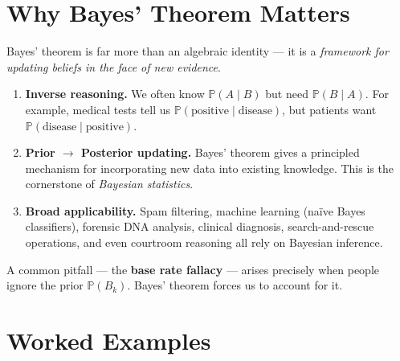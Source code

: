 \documentclass{article}
\theoremstyle{remark}
\newlength{\subsecindent}
\newenvironment{secbody}{%
  \begin{list}{}{%
    \setlength{\leftmargin}{\subsecindent}%
    \setlength{\rightmargin}{0pt}%
    \setlength{\topsep}{0pt}%
    \setlength{\partopsep}{0pt}%
    \setlength{\parsep}{\parskip}%
    \setlength{\itemsep}{\parskip}%
  }\item\relax
}{\end{list}}
\newcommand{\Prob}{\mathbb{P}}
\newcommand{\given}{\mid}
\begin{document}
\newpage
\section{Why Bayes' Theorem Matters}
\label{sec:why}

\begin{secbody}
Bayes' theorem is far more than an algebraic identity --- it is a
\emph{framework for updating beliefs in the face of new evidence}.

\begin{enumerate}
  \item \textbf{Inverse reasoning.}
    We often know $\Prob(A \given B)$ but need $\Prob(B \given A)$.
    For example, medical tests tell us
    $\Prob(\text{positive} \given \text{disease})$, but patients want
    $\Prob(\text{disease} \given \text{positive})$.

  \item \textbf{Prior $\to$ Posterior updating.}
    Bayes' theorem gives a principled mechanism for incorporating new data
    into existing knowledge.  This is the cornerstone of
    \emph{Bayesian statistics}.

  \item \textbf{Broad applicability.}
    Spam filtering, machine learning (na\"ive Bayes classifiers),
    forensic DNA analysis, clinical diagnosis, search-and-rescue
    operations, and even courtroom reasoning all rely on Bayesian
    inference.
\end{enumerate}

A common pitfall --- the \textbf{base rate fallacy} --- arises precisely
when people ignore the prior $\Prob(B_k)$. Bayes' theorem forces us to
account for it.
\end{secbody}

\newpage
\section{Worked Examples}
\label{sec:examples}

\end{document}
